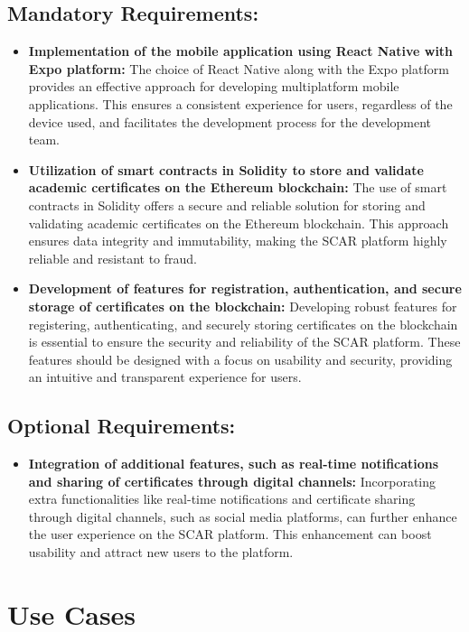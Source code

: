 \subsection{Mandatory Requirements:}

\begin{itemize}

    \item \textbf{Implementation of the mobile application using React Native with Expo platform:} The choice of React Native along with the Expo platform provides an effective approach for developing multiplatform mobile applications. This ensures a consistent experience for users, regardless of the device used, and facilitates the development process for the development team.

    \item \textbf{Utilization of smart contracts in Solidity to store and validate academic certificates on the Ethereum blockchain:} The use of smart contracts in Solidity offers a secure and reliable solution for storing and validating  academic certificates on the Ethereum blockchain. This approach ensures data integrity and immutability, making the SCAR platform highly reliable and resistant to fraud.

    \item \textbf{Development of features for registration, authentication, and secure storage of certificates on the blockchain:} Developing robust features for registering, authenticating, and securely storing certificates on the blockchain is essential to ensure the security and reliability of the SCAR platform. These features should be designed with a focus on usability and security, providing an intuitive and transparent experience for users.

\end{itemize}

\subsection{Optional Requirements:}

\begin{itemize}

    \item \textbf{Integration of additional features, such as real-time notifications and sharing of certificates through digital channels:} Incorporating extra functionalities like real-time notifications and certificate sharing through digital channels, such as social media platforms, can further enhance the user experience on the SCAR platform. This enhancement can boost usability and attract new users to the platform.
    
\end{itemize}

\section{Use Cases}\label{sec:use-cases}

